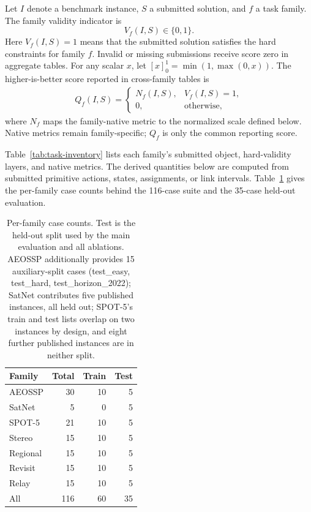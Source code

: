 \documentclass[]{mosi}
\begin{document}
Let \(I\) denote a benchmark instance, \(S\) a submitted solution, and \(f\) a task family. The family validity indicator is
\[
  V_f(I,S)\in\{0,1\}.
\]
Here \(V_f(I,S)=1\) means that the submitted solution satisfies the hard constraints for family \(f\). Invalid or missing submissions receive score zero in aggregate tables. For any scalar \(x\), let \([x]_0^1=\min(1,\max(0,x))\). The higher-is-better score reported in cross-family tables is
\[
  \begin{aligned}
  Q_f(I,S)=
  \begin{cases}
    N_f(I,S), & V_f(I,S)=1,\\
    0, & \text{otherwise},
  \end{cases}
  \end{aligned}
\]
where \(N_f\) maps the family-native metric to the normalized scale defined below. Native metrics remain family-specific; \(Q_f\) is only the common reporting score.

Table~\ref{tab:task-inventory} lists each family's submitted object, hard-validity layers, and native metrics. The derived quantities below are computed from submitted primitive actions, states, assignments, or link intervals. Table~\ref{tab:case-splits} gives the per-family case counts behind the 116-case suite and the 35-case held-out evaluation.

\begin{table}[t]
\centering
\footnotesize
\begin{tabular}{lrrr}
\hline
\textbf{Family} & \textbf{Total} & \textbf{Train} & \textbf{Test} \\
\hline
AEOSSP & 30 & 10 & 5 \\
SatNet & 5 & 0 & 5 \\
SPOT-5 & 21 & 10 & 5 \\
Stereo & 15 & 10 & 5 \\
Regional & 15 & 10 & 5 \\
Revisit & 15 & 10 & 5 \\
Relay & 15 & 10 & 5 \\
\hline
All & 116 & 60 & 35 \\
\hline
\end{tabular}
\caption{Per-family case counts. Test is the held-out split used by the main evaluation and all ablations. AEOSSP additionally provides 15 auxiliary-split cases (test\_easy, test\_hard, test\_horizon\_2022); SatNet contributes five published instances, all held out; SPOT-5's train and test lists overlap on two instances by design, and eight further published instances are in neither split.}
\label{tab:case-splits}
\end{table}
\end{document}
